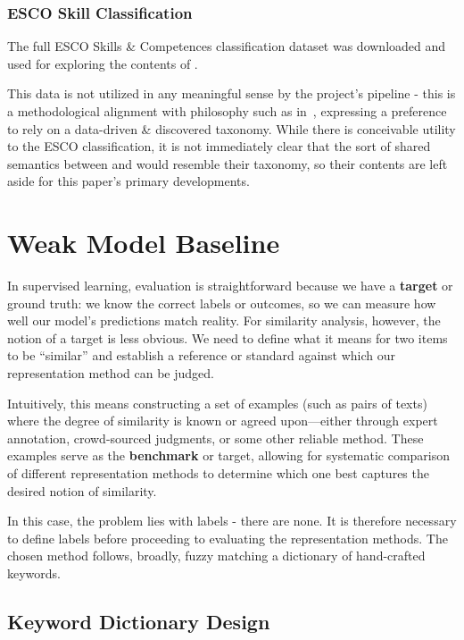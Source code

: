 \subsubsection{ESCO Skill Classification}
The full ESCO Skills \& Competences classification dataset was downloaded and used for exploring the contents of \jobposts{}.

This data is not utilized in any meaningful sense by the project's pipeline - this is a methodological alignment with philosophy such as in~\cite{escoe-2018-taxonomy},
expressing a preference to rely on a data-driven \& discovered taxonomy. While there is conceivable utility to the ESCO classification,
it is not immediately clear that the sort of shared semantics between \jobposts{} and \ghrepos{} would resemble their taxonomy, so their contents are left aside for this paper's primary developments.

\section{Weak Model Baseline}\label{section:weak-model-specification}

In supervised learning, evaluation is straightforward because we have a \textbf{target} or ground truth: we know the correct labels or outcomes, so we can measure how well our model’s predictions match reality.
For similarity analysis, however, the notion of a target is less obvious. We need to define what it means for two items to be “similar” and establish a reference or standard against which our representation method can be judged.

Intuitively, this means constructing a set of examples (such as pairs of texts) where the degree of similarity is known or agreed upon—either through expert annotation, crowd-sourced judgments, or some other reliable method.
These examples serve as the \textbf{benchmark} or target, allowing for systematic comparison of different representation methods to determine which one best captures the desired notion of similarity.

In this case, the problem lies with labels - there are none. It is therefore necessary to define labels before proceeding to evaluating the representation methods.
The chosen method follows, broadly, fuzzy matching a dictionary of hand-crafted keywords.

\subsection{Keyword Dictionary Design}


